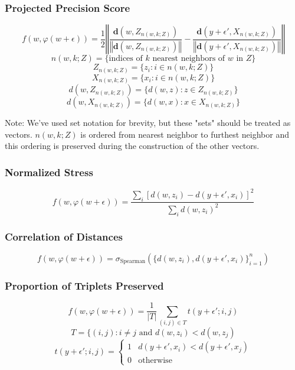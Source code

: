 \documentclass{article}
\begin{document}
\subsubsection{Projected Precision Score}
$$f(w, \varphi(w + \epsilon)) = \frac{1}{2} \left\Vert \frac{\textbf{d}(w, Z_{n(w,k;Z)})}{\left\Vert \textbf{d}(w, Z_{n(w,k;Z)}) \right\Vert} - \frac{\textbf{d}(y+\epsilon', X_{n(w,k;Z)})}{\left\Vert \textbf{d}(y+\epsilon', X_{n(w,k;Z)}) \right\Vert} \right\Vert$$
$$n(w,k;Z) = \{\textrm{indices of $k$ nearest neighbors of $w$ in $Z$}\}$$
$$Z_{n(w,k;Z)} = \{z_i:i \in n(w,k;Z) \}$$
$$X_{n(w,k;Z)} = \{x_i:i \in n(w,k;Z) \}$$
$$d(w, Z_{n(w,k;Z)}) = \{d(w, z) : z \in Z_{n(w,k;Z)}\}$$
$$d(w, X_{n(w,k;Z)}) = \{d(w, x) : x \in X_{n(w,k;Z)}\}$$

\noindent *Note: We've used set notation for brevity, but these "sets" should be treated as vectors. $n(w,k;Z)$ is ordered from nearest neighbor to furthest neighbor and this ordering is preserved during the construction of the other vectors.

\subsubsection{Normalized Stress}
$$f(w, \varphi(w + \epsilon)) = \frac{\sum_i [d(w, z_i) - d(y + \epsilon', x_i)]^2}{\sum_i d(w, z_i)^2}$$

\subsubsection{Correlation of Distances}
$$f(w, \varphi(w + \epsilon)) = \sigma_\textrm{Spearman}\left( \{d(w,z_i), d(y + \epsilon',x_i)\}_{i=1}^n \right)$$

\subsubsection{Proportion of Triplets Preserved}
$$f(w, \varphi(w + \epsilon))  = \frac{1}{|T|} \sum_{(i,j) \in T} t(y + \epsilon'; i, j)$$
$$T = \{(i,j) : i \neq j \textrm{ and } d(w, z_i) < d(w, z_j)$$
$$t(y + \epsilon'; i, j) = \begin{cases} 
1 & d(y+\epsilon', x_i) < d(y + \epsilon', x_j) \\
0 & \textrm{otherwise}
\end{cases}$$
\end{document}
